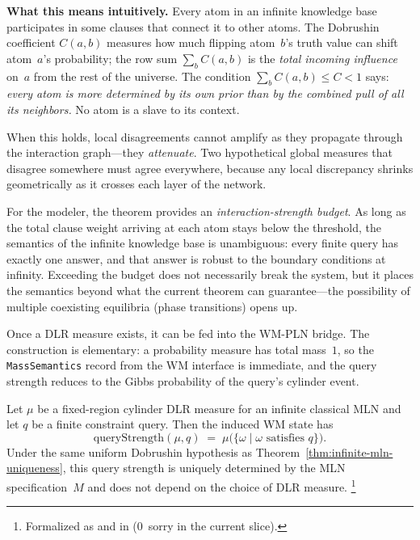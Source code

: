 \documentclass[11pt,openany]{report}
\begin{document}
\noindent
\textbf{What this means intuitively.}  Every atom in an infinite knowledge
base participates in some clauses that connect it to other atoms.  The
Dobrushin coefficient $C(a,b)$ measures how much flipping atom~$b$'s truth
value can shift atom~$a$'s probability; the row sum $\sum_b C(a,b)$ is the
\emph{total incoming influence} on~$a$ from the rest of the universe.  The
condition $\sum_b C(a,b) \le C < 1$ says: \emph{every atom is more
determined by its own prior than by the combined pull of all its neighbors.}
No atom is a slave to its context.

When this holds, local disagreements cannot amplify as they propagate through
the interaction graph---they \emph{attenuate}.  Two hypothetical global
measures that disagree somewhere must agree everywhere, because any local
discrepancy shrinks geometrically as it crosses each layer of the network.

For the modeler, the theorem provides an \emph{interaction-strength budget}.
As long as the total clause weight arriving at each atom stays below the
threshold, the semantics of the infinite knowledge base is unambiguous:
every finite query has exactly one answer, and that answer is robust to
the boundary conditions at infinity.  Exceeding the budget does not
necessarily break the system, but it places the semantics beyond what
the current theorem can guarantee---the possibility of multiple coexisting
equilibria (phase transitions) opens up.

\medskip
\noindent
Once a DLR measure exists, it can be fed into the WM-PLN bridge.  The
construction is elementary: a probability measure has total mass~$1$, so
the \texttt{MassSemantics} record from the WM interface is immediate, and the
query strength reduces to the Gibbs probability of the query's cylinder event.

\begin{theorem}
\label{thm:infinite-mln-worldmodel}
Let $\mu$ be a fixed-region cylinder DLR measure for an infinite classical
MLN and let $q$ be a finite constraint query.  Then the induced WM state has
\[
  \mathrm{queryStrength}(\mu, q)
  \;=\; \mu\!\bigl(\{\omega \mid \omega \text{ satisfies } q\}\bigr).
\]
Under the same uniform Dobrushin hypothesis as
Theorem~\ref{thm:infinite-mln-uniqueness}, this query strength is uniquely
determined by the MLN specification~$M$ and does not depend on the choice of
DLR measure.%
\footnote{Formalized as
 and
 in
(0~sorry in the current slice).}
\end{theorem}
\end{document}
